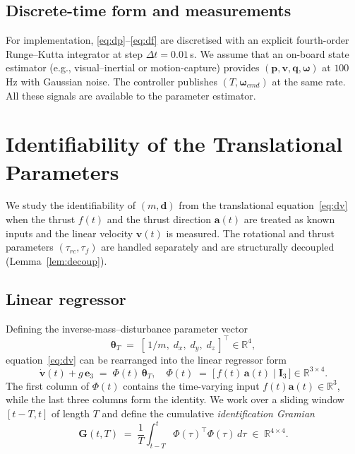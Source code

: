 \documentclass[lettersize,journal]{IEEEtran}
\newcommand{\R}{\mathbb{R}}
\newcommand{\vect}[1]{\bm{#1}}
\newcommand{\mat}[1]{\mathbf{#1}}
\newcommand{\dt}{\Delta t}
\begin{document}
\subsection{Discrete-time form and measurements}
For implementation, \eqref{eq:dp}--\eqref{eq:df} are discretised
with an explicit fourth-order Runge--Kutta integrator at step
$\dt=0.01$\,s.  We assume that an on-board state estimator
(e.g., visual--inertial or motion-capture) provides
$(\vect p,\vect v,\vect q,\vect\omega)$ at $100$\,Hz with
Gaussian noise.  The controller publishes $(T,\vect\omega_{cmd})$
at the same rate.  All these signals are available to the
parameter estimator.

\section{Identifiability of the Translational Parameters}\label{sec:obs}

We study the identifiability of $(m,\vect d)$ from the
translational equation~\eqref{eq:dv} when the thrust $f(t)$ and
the thrust direction $\vect a(t)$ are treated as known inputs and
the linear velocity $\vect v(t)$ is measured.  The rotational and
thrust parameters $(\tau_{rc},\tau_f)$ are handled separately and
are structurally decoupled (Lemma~\ref{lem:decoup}).

\subsection{Linear regressor}
Defining the inverse-mass--disturbance parameter vector
\begin{equation}
\vect\theta_T \;=\; [\,1/m,\;d_x,\;d_y,\;d_z\,]^\top \in \R^4,
\end{equation}
equation~\eqref{eq:dv} can be rearranged into the linear
regressor form
\begin{equation}
\dot{\vect v}(t) + g\,\vect e_3 \;=\; \Phi(t)\,\vect\theta_T,
\quad
\Phi(t) \;=\;\big[\,f(t)\,\vect a(t)\;\big|\;\mat I_3\,\big] \in \R^{3\times 4}.
\label{eq:regressor}
\end{equation}
The first column of $\Phi(t)$ contains the time-varying input
$f(t)\vect a(t)\in\R^3$, while the last three columns form the
identity.  We work over a sliding window $[t-T,t]$ of length $T$
and define the cumulative \emph{identification Gramian}
\begin{equation}
\mat G(t,T) \;=\; \frac{1}{T}\int_{t-T}^{t}\!\!\Phi(\tau)^\top\Phi(\tau)\,d\tau \;\in\;\R^{4\times 4}.
\label{eq:gramian}
\end{equation}
\end{document}
